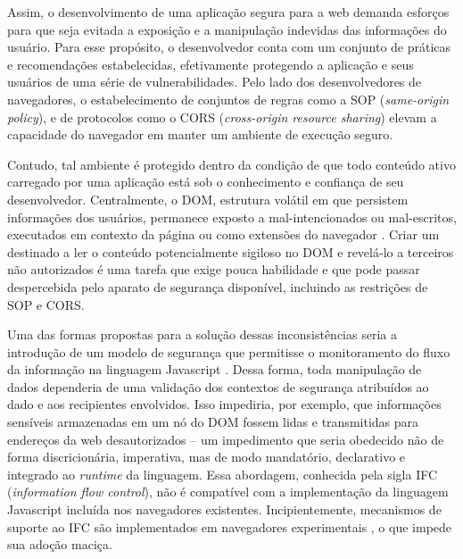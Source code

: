 Assim, o desenvolvimento de uma aplicação segura para a web demanda esforços para que seja evitada a exposição e a manipulação indevidas das informações do usuário. Para esse propósito, o desenvolvedor conta com um conjunto de práticas e recomendações estabelecidas, efetivamente protegendo a aplicação e seus usuários de uma série de vulnerabilidades. Pelo lado dos desenvolvedores de navegadores, o estabelecimento de conjuntos de regras como a SOP (\textit{same-origin policy}), e de protocolos como o CORS (\textit{cross-origin resource sharing}) elevam a capacidade do navegador em manter um ambiente de execução seguro.%

Contudo, tal ambiente é protegido dentro da condição de que todo conteúdo ativo carregado por uma aplicação está sob o conhecimento e confiança de seu desenvolvedor. Centralmente, o DOM, estrutura volátil em que persistem informações dos usuários, permanece exposto a {\scripts} mal-intencionados ou mal-escritos, executados em contexto da página ou como extensões do navegador \cite{Heule2015_Most_Dangerous_Code}. Criar um {\script} destinado a ler o conteúdo potencialmente sigiloso no DOM e revelá-lo a terceiros não autorizados é uma tarefa que exige pouca habilidade e que pode passar despercebida pelo aparato de segurança disponível, incluindo as restrições de SOP e CORS.

Uma das formas propostas para a solução dessas inconsistências seria a introdução de um modelo de segurança que permitisse o monitoramento do fluxo da informação na linguagem Javascript \cite[p.3]{Heule2015_IFC_Inside}. Dessa forma, toda manipulação de dados dependeria de uma validação dos contextos de segurança atribuídos ao dado e aos recipientes envolvidos. Isso impediria, por exemplo, que informações sensíveis armazenadas em um nó do DOM fossem lidas e transmitidas para endereços da web desautorizados -- um impedimento que seria obedecido não de forma discricionária, imperativa, mas de modo mandatório, declarativo e integrado ao \textit{runtime} da linguagem. Essa abordagem, conhecida pela sigla IFC (\textit{information flow control}), não é compatível com a implementação da linguagem Javascript incluída nos navegadores existentes. Incipientemente, mecanismos de suporte ao IFC são implementados em navegadores experimentais \cite{Hedin2014, Bichhawat2014}, o que impede sua adoção maciça.

